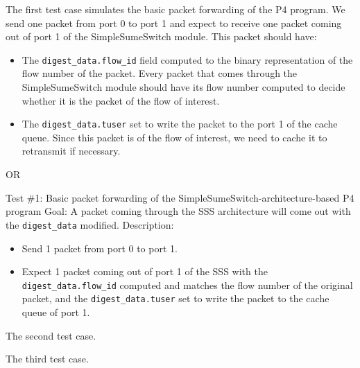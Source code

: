 The first test case simulates the basic packet forwarding of the P4 program. We send one packet from port 0 to port 1 and expect to receive one packet coming out of port 1 of the SimpleSumeSwitch module. This packet should have:
\begin{itemize}
	\item The \verb|digest_data.flow_id| field computed to the binary representation of the flow number of the packet. Every packet that comes through the SimpleSumeSwitch module should have its flow number computed to decide whether it is the packet of the flow of interest.
	\item The \verb|digest_data.tuser| set to write the packet to the port 1 of the cache queue. Since this packet is of the flow of interest, we need to cache it to retransmit if necessary. 
\end{itemize} 

OR

Test \#1: Basic packet forwarding of the SimpleSumeSwitch-architecture-based P4 program
Goal: A packet coming through the SSS architecture will come out with the \texttt{digest\_data} modified.
Description:
\begin{itemize}
\item Send 1 packet from port 0 to port 1.
\item Expect 1 packet coming out of port 1 of the SSS with the \texttt{digest\_data.flow\_id} computed and matches the flow number of the original packet, and the \texttt{digest\_data.tuser} set to write the packet to the cache queue of port 1.
\end{itemize}


The second test case.

The third test case.

